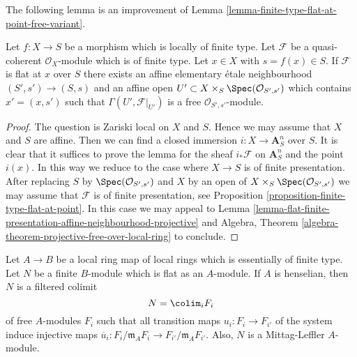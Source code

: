 \noindent
The following lemma is an improvement of
Lemma \ref{lemma-finite-type-flat-at-point-free-variant}.

\begin{lemma}
\label{lemma-flat-finite-type-affine-neighbourhood-projective}
Let $f : X \to S$ be a morphism which is locally of finite type.
Let $\mathcal{F}$ be a quasi-coherent $\mathcal{O}_X$-module which is
of finite type. Let $x \in X$ with $s = f(x) \in S$.
If $\mathcal{F}$ is flat at $x$ over $S$ there exists an affine
elementary \'etale neighbourhood $(S', s') \to (S, s)$ and
an affine open $U' \subset X \times_S \Spec(\mathcal{O}_{S', s'})$
which contains $x' = (x, s')$ such that
$\Gamma(U', \mathcal{F}|_{U'})$ is a free
$\mathcal{O}_{S', s'}$-module.
\end{lemma}

\begin{proof}
The question is Zariski local on $X$ and $S$. Hence we may assume
that $X$ and $S$ are affine. Then we can find a closed immersion
$i : X \to \mathbf{A}^n_S$ over $S$. It is clear that it suffices to
prove the lemma for the sheaf $i_*\mathcal{F}$ on $\mathbf{A}^n_S$
and the point $i(x)$. In this way we reduce to the case where $X \to S$ is
of finite presentation. After replacing $S$ by
$\Spec(\mathcal{O}_{S', s'})$ and $X$ by an open of
$X \times_S \Spec(\mathcal{O}_{S', s'})$ we may assume that
$\mathcal{F}$ is of finite presentation, see
Proposition \ref{proposition-finite-type-flat-at-point}.
In this case we may appeal to
Lemma \ref{lemma-flat-finite-presentation-affine-neighbourhood-projective}
and
Algebra, Theorem \ref{algebra-theorem-projective-free-over-local-ring}
to conclude.
\end{proof}

\begin{lemma}
\label{lemma-flat-finite-type-local-colimit-free}
Let $A \to B$ be a local ring map of local rings which is essentially of
finite type. Let $N$ be a finite $B$-module which is flat as an $A$-module.
If $A$ is henselian, then $N$ is a filtered colimit
$$
N = \colim_i F_i
$$
of free $A$-modules $F_i$ such that all transition maps
$u_i : F_i \to F_{i'}$ of the system induce injective maps
$\overline{u}_i : F_i/\mathfrak m_AF_i \to F_{i'}/\mathfrak m_AF_{i'}$.
Also, $N$ is a Mittag-Leffler $A$-module.
\end{lemma}

